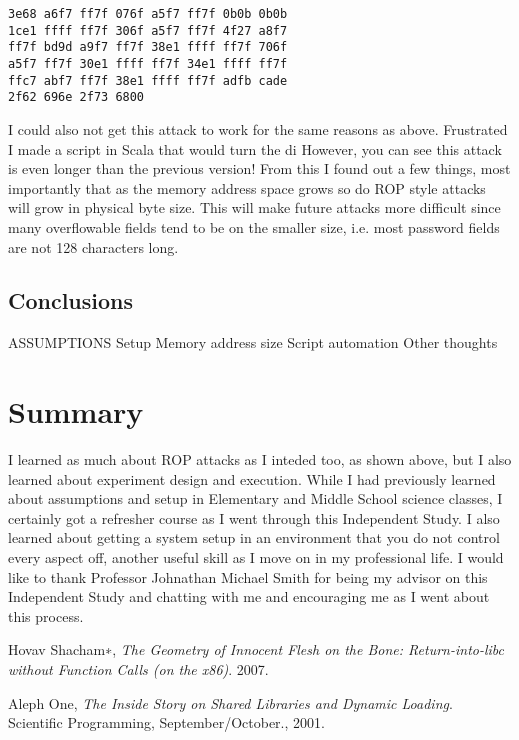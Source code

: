 \documentclass[11pt]{amsart}
\begin{document}
\begin{verbatim}
3e68 a6f7 ff7f 076f a5f7 ff7f 0b0b 0b0b 
1ce1 ffff ff7f 306f a5f7 ff7f 4f27 a8f7 
ff7f bd9d a9f7 ff7f 38e1 ffff ff7f 706f 
a5f7 ff7f 30e1 ffff ff7f 34e1 ffff ff7f 
ffc7 abf7 ff7f 38e1 ffff ff7f adfb cade 
2f62 696e 2f73 6800
\end{verbatim}
I could also not get this attack to work for the same reasons as above. Frustrated I made a script in Scala that would turn the di
However,  you can see this attack is even longer than the previous version!  From this I found out a few things, most importantly that as the memory address space grows so do ROP style attacks will grow in physical byte size.  This will make future attacks more difficult since many overflowable fields tend to be on the smaller size, i.e. most password fields are not 128 characters long.
\subsection*{Conclusions}
ASSUMPTIONS
Setup
Memory address size
Script automation
Other thoughts
\section*{Summary}
I learned as much about ROP attacks as I inteded too, as shown above, but I also learned about experiment design and execution. While I had previously learned about assumptions and setup in Elementary and Middle School science classes, I certainly got a refresher course as I went through this Independent Study. I also learned about getting a system setup in an environment that you do not control every aspect off, another useful skill as I move on in my professional life.
I would like to thank Professor Johnathan Michael Smith for being my advisor on this Independent Study and chatting with me and encouraging me as I went about this process.

\begin{thebibliography}{1}

  Hovav Shacham∗,
  \emph{The Geometry of Innocent Flesh on the Bone: Return-into-libc without Function Calls (on the x86)}.
  2007.

  Aleph One,
  \emph{The Inside Story on Shared Libraries and Dynamic Loading}.
  Scientific Programming, September/October.,
  2001.

\end{thebibliography}
\end{document}
